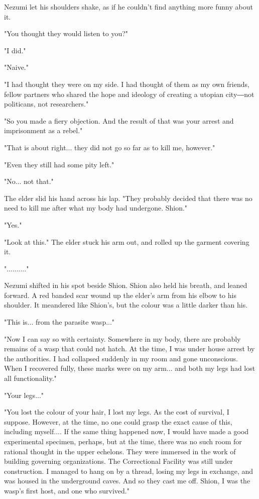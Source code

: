 Nezumi let his shoulders shake, as if he couldn't find anything more
funny about it.

"You thought they would listen to you?"

"I did."

"Naive."

"I had thought they were on my side. I had thought of them as my own
friends, fellow partners who shared the hope and ideology of creating a
utopian city―not politicans, not researchers."

"So you made a fiery objection. And the result of that was your arrest
and imprisonment as a rebel."

"That is about right... they did not go so far as to kill me, however."

"Even they still had some pity left."

"No... not that."

The elder slid his hand across his lap. "They probably decided that
there was no need to kill me after what my body had undergone. Shion."

"Yes."

"Look at this." The elder stuck his arm out, and rolled up the garment
covering it.

".........."

Nezumi shifted in his spot beside Shion. Shion also held his breath, and
leaned forward. A red banded scar wound up the elder's arm from his
elbow to his shoulder. It meandered like Shion's, but the colour was a
little darker than his.

"This is... from the parasite wasp..."

"Now I can say so with certainty. Somewhere in my body, there are
probably remains of a wasp that could not hatch. At the time, I was
under house arrest by the authorities. I had collapsed suddenly in my
room and gone unconscious. When I recovered fully, these marks were on
my arm... and both my legs had lost all functionality."

"Your legs..."

"You lost the colour of your hair, I lost my legs. As the cost of
survival, I suppose. However, at the time, no one could grasp the exact
cause of this, including myself.... If the same thing happened now, I
would have made a good experimental specimen, perhaps, but at the time,
there was no such room for rational thought in the upper echelons. They
were immersed in the work of building governing organizations. The
Correctional Facility was still under construction. I managed to hang on
by a thread, losing my legs in exchange, and was housed in the
underground caves. And so they cast me off. Shion, I was the wasp's
first host, and one who survived."

